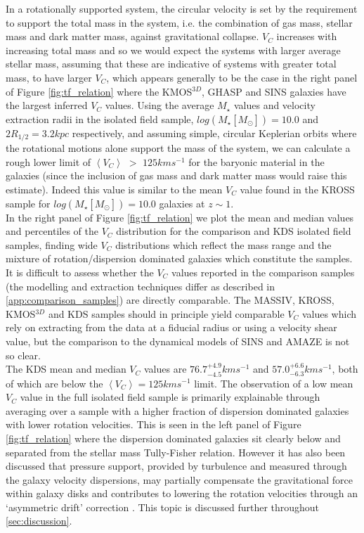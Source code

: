 \documentclass[fleqn,usenatbib]{mn2e}
\begin{document}
In a rotationally supported system, the circular velocity is set by the requirement to support the total mass in the system, i.e. the combination of gas mass, stellar mass and dark matter mass, against gravitational collapse.
$V_{C}$ increases with increasing total mass and so we would expect the systems with larger average stellar mass, assuming that these are indicative of systems with greater total mass, to have larger $V_{C}$, which appears generally to be the case in the right panel of Figure \ref{fig:tf_relation} where the KMOS$^{3D}$, GHASP and SINS galaxies have the largest inferred $V_{C}$ values.
Using the average $M_{\star}$ values and velocity extraction radii in the isolated field sample, $log(M_{\star}[M_{\odot}])=10.0$ and $2R_{1/2} = 3.2kpc$ respectively, and assuming simple, circular Keplerian orbits where the rotational motions alone support the mass of the system, we can calculate a rough lower limit of $\left<V_{C}\right>$ $>$ $125kms^{-1}$ for the baryonic material in the galaxies (since the inclusion of gas mass and dark matter mass would raise this estimate).
Indeed this value is similar to the mean $V_{C}$ value found in the KROSS sample for $log(M_{\star}[M_{\odot}])=10.0$ galaxies at $z\sim1$. \\

In the right panel of Figure \ref{fig:tf_relation} we plot the mean and median values and percentiles of the $V_{C}$ distribution for the comparison and KDS isolated field samples, finding wide $V_{C}$ distributions which reflect the mass range and the mixture of rotation/dispersion dominated galaxies which constitute the samples.
It is difficult to assess whether the $V_{C}$ values reported in the comparison samples (the modelling and extraction techniques differ as described in \cref{app:comparison_samples}) are directly comparable.
The MASSIV, KROSS, KMOS$^{3D}$ and KDS samples should in principle yield comparable $V_{C}$ values which rely on extracting from the data at a fiducial radius or using a velocity shear value, but the comparison to the dynamical models of SINS and AMAZE is not so clear. \\

The KDS mean and median $V_{C}$ values are $76.7^{+4.9}_{-4.5}kms^{-1}$ and $57.0^{+6.6}_{-6.3}kms^{-1}$, both of which are below the $\left<V_{C}\right> = 125kms^{-1}$ limit.
The observation of a low mean $V_{C}$ value in the full isolated field sample is primarily explainable through averaging over a sample with a higher fraction of dispersion dominated galaxies with lower rotation velocities.
This is seen in the left panel of Figure \ref{fig:tf_relation} where the dispersion dominated galaxies sit clearly below and separated from the stellar mass Tully-Fisher relation.
However it has also been discussed that pressure support, provided by turbulence and measured through the galaxy velocity dispersions, may partially compensate the gravitational force within galaxy disks and contributes to lowering the rotation velocities through an `asymmetric drift' correction \citep[e.g.][]{Burkert2010,Newman2013,Genzel2017}.
This topic is discussed further throughout \cref{sec:discussion}. 
\end{document}
